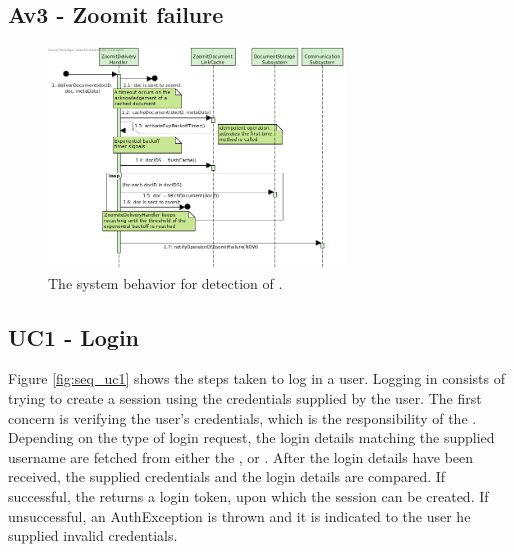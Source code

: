\subsection{Av3 - Zoomit failure}

\begin{figure}[!htp]
    \centering
    \includegraphics[width=0.7\textwidth]{figures/Av3 - Zoomit failure.png}
    \caption{The system behavior for detection of .
        }\label{fig:seq_av3fail}
\end{figure}



\subsection{UC1 - Login}\label{sec:seq_uc1}
Figure \ref{fig:seq_uc1} shows the steps taken to log in a user. Logging in consists of trying to create a session using the credentials supplied by the user. The first concern is verifying the user's credentials, which is the responsibility of the . Depending on the type of login request, the login details matching the supplied username are fetched from either the ,  or . After the login details have been received, the supplied credentials and the login details are compared. If successful, the  returns a login token, upon which the session can be created. If unsuccessful, an AuthException is thrown and it is indicated to the user he supplied invalid credentials.

